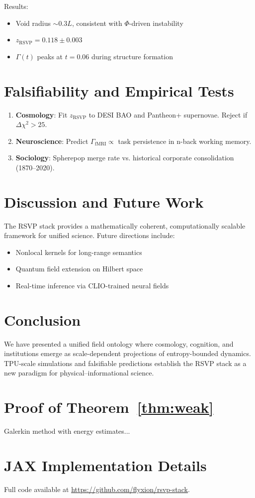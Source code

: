 \documentclass[11pt,twoside]{article}
\theoremstyle{definition}
\theoremstyle{remark}
\begin{document}
Results:
\begin{itemize}
\item Void radius $\sim 0.3L$, consistent with $\Phi$-driven instability
\item $z_{\mathrm{RSVP}} = 0.118 \pm 0.003$
\item $\Gamma(t)$ peaks at $t=0.06$ during structure formation
\end{itemize}

\section{Falsifiability and Empirical Tests}
\label{sec:tests}

\begin{enumerate}
\item \textbf{Cosmology}: Fit $z_{\mathrm{RSVP}}$ to DESI BAO and Pantheon+ supernovae. Reject if $\Delta\chi^2 > 25$.
\item \textbf{Neuroscience}: Predict $\Gamma_{\mathrm{fMRI}} \propto$ task persistence in n-back working memory.
\item \textbf{Sociology}: Spherepop merge rate vs. historical corporate consolidation (1870--2020).
\end{enumerate}

\section{Discussion and Future Work}
\label{sec:discuss}

The RSVP stack provides a mathematically coherent, computationally scalable framework for unified science. Future directions include:
\begin{itemize}
\item Nonlocal kernels for long-range semantics
\item Quantum field extension on Hilbert space
\item Real-time inference via CLIO-trained neural fields
\end{itemize}

\section{Conclusion}
\label{sec:conclusion}

We have presented a unified field ontology where cosmology, cognition, and institutions emerge as scale-dependent projections of entropy-bounded dynamics. TPU-scale simulations and falsifiable predictions establish the RSVP stack as a new paradigm for physical--informational science.




\appendix

\section{Proof of Theorem~\ref{thm:weak}}
Galerkin method with energy estimates...

\section{JAX Implementation Details}
Full code available at \url{https://github.com/flyxion/rsvp-stack}.
\end{document}
